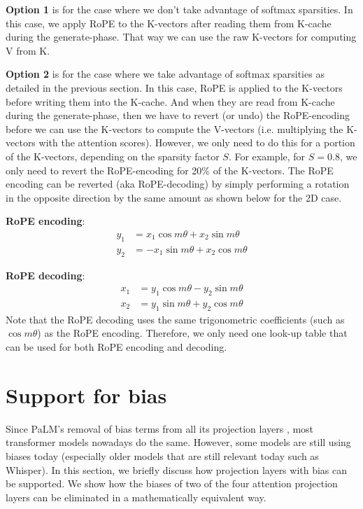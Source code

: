 \documentclass{article}
\begin{document}
\textbf{Option 1} is for the case where we don’t take advantage of softmax sparsities. In this case, we apply RoPE to the K-vectors after reading them from K-cache during the generate-phase. That way we can use the raw K-vectors for computing V from K.

\textbf{Option 2} is for the case where we take advantage of softmax sparsities as detailed in the previous section. In this case, RoPE is applied to the K-vectors before writing them into the K-cache. And when they are read from K-cache during the generate-phase, then we have to revert (or undo) the RoPE-encoding before we can use the K-vectors to compute the V-vectors (i.e. multiplying the K-vectors with the attention scores). However, we only need to do this for a portion of the K-vectors, depending on the sparsity factor $S$. For example, for $S = 0.8$, we only need to revert the RoPE-encoding for 20\% of the K-vectors. The RoPE encoding can be reverted (aka RoPE-decoding) by simply performing a rotation in the opposite direction by the same amount as shown below for the 2D case.

\textbf{RoPE encoding}:
\begin{align*}
  y_1 &=  x_1 \cos{m \theta} + x_2 \sin{m \theta} \\
  y_2 &= -x_1 \sin{m \theta} + x_2 \cos{m \theta}
\end{align*}

\textbf{RoPE decoding}:
\begin{align*}
  x_1 &= y_1 \cos{m \theta} - y_2 \sin{m \theta} \\
  x_2 &= y_1 \sin{m \theta} + y_2 \cos{m \theta}
\end{align*}
Note that the RoPE decoding uses the same trigonometric coefficients (such as $\cos{m \theta}$) as the RoPE encoding. Therefore, we only need one look-up table that can be used for both RoPE encoding and decoding.

\section{Support for bias}
Since PaLM’s removal of bias terms from all its projection layers \citep{PaLM}, most transformer models nowadays do the same. However, some models are still using biases today (especially older models that are still relevant today such as Whisper). In this section, we briefly discuss how projection layers with bias can be supported. We show how the biases of two of the four attention projection layers can be eliminated in a mathematically equivalent way.
\end{document}
